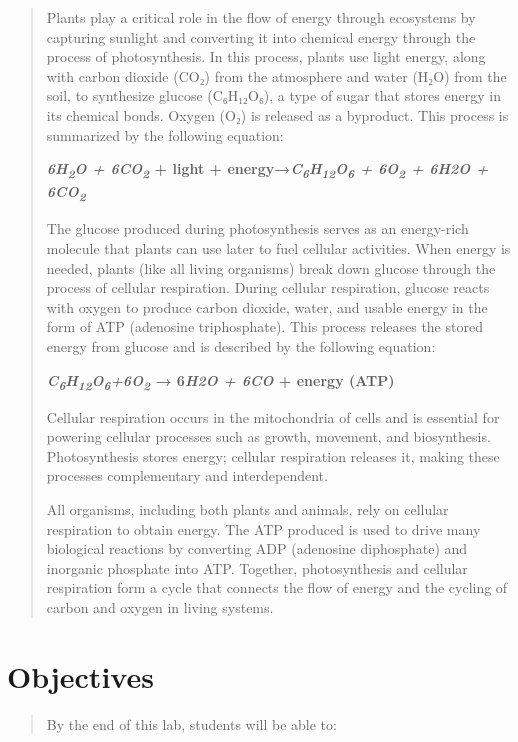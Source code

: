 \documentclass[
  letterpaper,
  DIV=11,
  numbers=noendperiod]{scrreprt}
\begin{document}
\begin{quote}
Plants play a critical role in the flow of energy through ecosystems by
capturing sunlight and converting it into chemical energy through the
process of photosynthesis. In this process, plants use light energy,
along with carbon dioxide (CO₂) from the atmosphere and water (H₂O) from
the soil, to synthesize glucose (C₆H₁₂O₆), a type of sugar that stores
energy in its chemical bonds. Oxygen (O₂) is released as a byproduct.
This process is summarized by the following equation:

\textbf{\emph{6H\textsubscript{2}O + 6CO\textsubscript{2}} + light +
energy→\emph{C\textsubscript{6}H\textsubscript{12}O\textsubscript{6} +
6O\textsubscript{2} + 6H2O + 6CO\textsubscript{2}}}

The glucose produced during photosynthesis serves as an energy-rich
molecule that plants can use later to fuel cellular activities. When
energy is needed, plants (like all living organisms) break down glucose
through the process of cellular respiration. During cellular
respiration, glucose reacts with oxygen to produce carbon dioxide,
water, and usable energy in the form of ATP (adenosine triphosphate).
This process releases the stored energy from glucose and is described by
the following equation:

\textbf{\emph{C\textsubscript{6}H\textsubscript{12}O\textsubscript{6}+6O\textsubscript{2}}
→ 6\emph{H2O + 6CO} + energy (ATP)}

Cellular respiration occurs in the mitochondria of cells and is
essential for powering cellular processes such as growth, movement, and
biosynthesis. Photosynthesis stores energy; cellular respiration
releases it, making these processes complementary and interdependent.

All organisms, including both plants and animals, rely on cellular
respiration to obtain energy. The ATP produced is used to drive many
biological reactions by converting ADP (adenosine diphosphate) and
inorganic phosphate into ATP. Together, photosynthesis and cellular
respiration form a cycle that connects the flow of energy and the
cycling of carbon and oxygen in living systems.
\end{quote}

\section{\texorpdfstring{\textbf{Objectives}}{Objectives}}\label{objectives-2}

\begin{quote}
By the end of this lab, students will be able to:
\end{quote}
\end{document}
